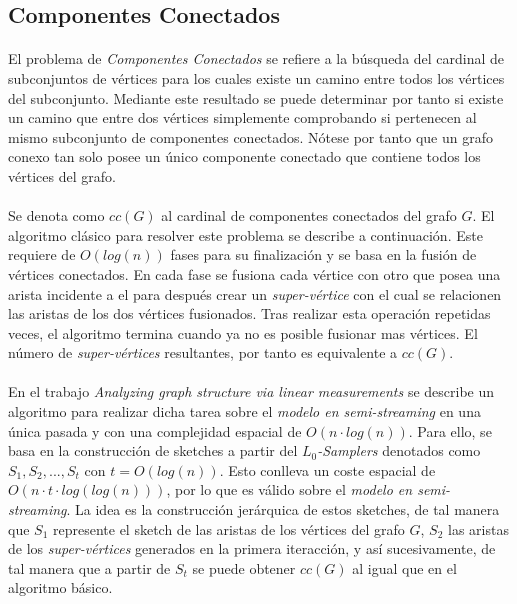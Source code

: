 \documentclass{subfiles}
\begin{document}
      \subsection{Componentes Conectados}
      \label{sec:graph_connected_components}

        \paragraph{}
        El problema de \emph{Componentes Conectados} se refiere a la búsqueda del cardinal de subconjuntos de vértices para los cuales existe un camino entre todos los vértices del subconjunto. Mediante este resultado se puede determinar por tanto si existe un camino que entre dos vértices simplemente comprobando si pertenecen al mismo subconjunto de componentes conectados. Nótese por tanto que un grafo conexo tan solo posee un único componente conectado que contiene todos los vértices del grafo.

        \paragraph{}
        Se denota como $cc(G)$ al cardinal de componentes conectados del grafo $G$. El algoritmo clásico para resolver este problema se describe a continuación. Este requiere de $O(log(n))$ fases para su finalización y se basa en la fusión de vértices conectados. En cada fase se fusiona cada vértice con otro que posea una arista incidente a el para después crear un \emph{super-vértice} con el cual se relacionen las aristas de los dos vértices fusionados. Tras realizar esta operación repetidas veces, el algoritmo termina cuando ya no es posible fusionar mas vértices. El número de \emph{super-vértices} resultantes, por tanto es equivalente a $cc(G)$.

        \paragraph{}
        En el trabajo \emph{Analyzing graph structure via linear measurements} \cite{ahn2012analyzing} se describe un algoritmo para realizar dicha tarea sobre el \emph{modelo en semi-streaming} en una única pasada y con una complejidad espacial de $O(n \cdot log(n))$. Para ello, se basa en la construcción de sketches a partir del \emph{$L_0$-Samplers} denotados como $S_1, S_2, ..., S_t$ con $t = O(log(n))$. Esto conlleva un coste espacial de $O(n\cdot t \cdot log(log(n)))$, por lo que es válido sobre el \emph{modelo en semi-streaming}. La idea es la construcción jerárquica de estos sketches, de tal manera que $S_1$ represente el sketch de las aristas de los vértices del grafo $G$, $S_2$ las aristas de los \emph{super-vértices} generados en la primera iteracción, y así sucesivamente, de tal manera que a partir de $S_t$ se puede obtener $cc(G)$ al igual que en el algoritmo básico.
\end{document}
